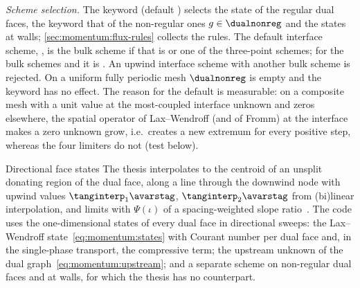 \emph{Scheme selection.} The keyword  (default
) selects the state of the regular dual faces, the
keyword  that of the non-regular ones
$g\in\dualnonreg$ and the states at walls; \cref{sec:momentum:flux-rules}
collects the rules.
The default interface scheme,
, is the bulk scheme if
that is  or one of the three-point schemes; for the bulk
schemes  and  it is
. An upwind interface scheme with another bulk
scheme is rejected. On a uniform fully periodic mesh $\dualnonreg$ is empty
and the keyword has no effect. The reason
for the default is measurable: on a composite mesh with a unit value at
the most-coupled interface unknown and zeros elsewhere, the spatial operator
of Lax--Wendroff (and of Fromm) at the interface makes a zero unknown grow,
i.e.\ creates a new extremum for every positive step, whereas the four
limiters do not (test below).

\begin{deviation}{Directional face states}
The thesis interpolates to the centroid of an unsplit donating region of the
dual face, along a line through the downwind node with upwind values
$\tanginterp_1\avarstag$, $\tanginterp_2\avarstag$ from (bi)linear
interpolation, and limits with $\Psi(\iota)$ of a spacing-weighted slope
ratio~. The code uses the one-dimensional states
of every dual face in directional sweeps: the Lax--Wendroff
state~\cref{eq:momentum:states} with Courant number per dual face and, in the
single-phase transport, the compressive term; the upstream unknown of the
dual graph~\cref{eq:momentum:upstream}; and a separate scheme on non-regular
dual faces and at walls, for which the thesis has no counterpart.
\end{deviation}

